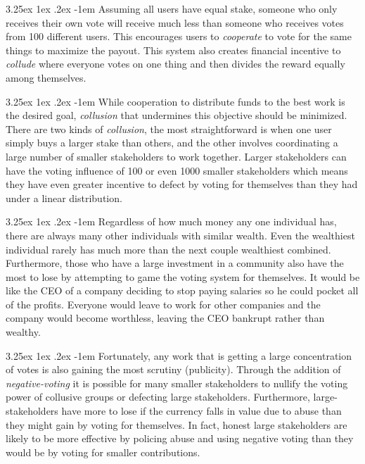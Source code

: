 \documentclass{article}
\makeatletter
\newcounter{subsubsubsection}[subsubsection]
\renewcommand\paragraph{\@startsection{paragraph}{5}{\z@}%
  {3.25ex \@plus1ex \@minus.2ex}%
  {-1em}%
  {\normalfont\normalsize\bfseries}}
\makeatother
\begin{document}
                \paragraph{}
                    Assuming all users have equal stake, someone who only
receives their own vote will receive much less than someone who receives
votes from 100 different users. This encourages users to \textit{cooperate}
to vote for the same things to maximize the payout. This system also
creates financial incentive to \textit{collude} where everyone votes on one
thing and then divides the reward equally among themselves.


                    \paragraph{}
                        While cooperation to distribute funds to the best
work is the desired goal, \textit{collusion} that undermines this objective
should be minimized. There are two kinds of \textit{collusion}, the most
straightforward is when one user simply buys a larger stake than others,
and the other involves coordinating a large number of smaller stakeholders
to work together. Larger stakeholders can have the voting influence of 100
or even 1000 smaller stakeholders which means they have even greater
incentive to defect by voting for themselves than they had under a linear
distribution.

                    \paragraph{}
                        Regardless of how much money any one individual
has, there are always many other individuals with similar wealth. Even the
wealthiest individual rarely has much more than the next couple wealthiest
combined. Furthermore, those who have a large investment in a community
also have the most to lose by attempting to game the voting system for
themselves. It would be like the CEO of a company deciding to stop paying
salaries so he could pocket all of the profits. Everyone would leave to
work for other companies and the company would become worthless, leaving
the CEO bankrupt rather than wealthy.

                    \paragraph{}
                        Fortunately, any work that is getting a large
concentration of votes is also gaining the most scrutiny (publicity).
Through the addition of \textit{negative-voting} it is possible for many
smaller stakeholders to nullify the voting power of collusive groups or
defecting large stakeholders. Furthermore, large-stakeholders have more to
lose if the currency falls in value due to abuse than they might gain by
voting for themselves. In fact, honest large stakeholders are likely to be
more effective by policing abuse and using negative voting than they would
be by voting for smaller contributions.
\end{document}
